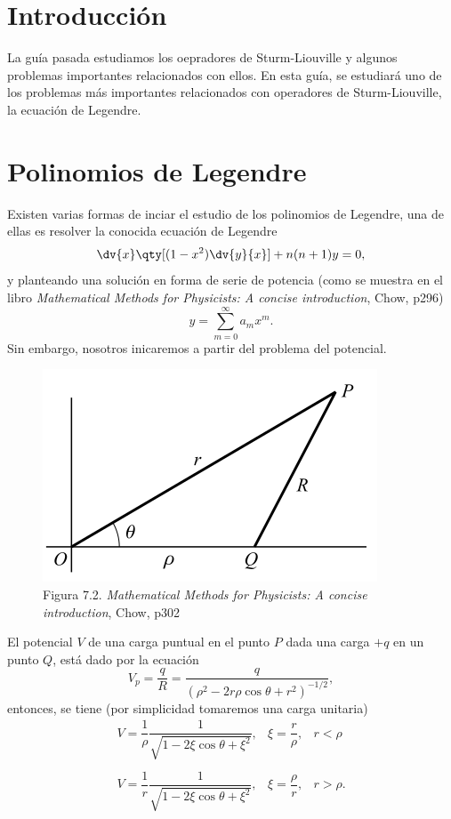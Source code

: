 \section*{Introducción}
La guía pasada estudiamos los oepradores de Sturm-Liouville y algunos problemas importantes relacionados con ellos. En esta guía, se estudiará uno de los problemas más importantes relacionados con operadores de Sturm-Liouville, la ecuación de Legendre.


\section*{Polinomios de Legendre}
Existen varias formas de inciar el estudio de los polinomios de Legendre, una de ellas es resolver la conocida ecuación de Legendre
	\begin{equation}
		\dv{x} \qty[(1 - x^2) \dv{y}{x}] + n(n + 1)y = 0, \label{eqlegendre}
	\end{equation}
y planteando una solución en forma de serie de potencia (como se muestra en el libro \textit{Mathematical Methods for Physicists: A concise introduction}, Chow, p296)
	$$ y = \sum _{m = 0} ^\infty a_m x^m. $$
Sin embargo, nosotros inicaremos a partir del problema del potencial.

\begin{figure}[H]
	\centering
	\includegraphics[scale=0.5]{./img/potential.png}
	\caption{Figura 7.2. \textit{Mathematical Methods for Physicists: A concise introduction}, Chow, p302}
	\label{potential}
\end{figure}

El potencial $V$ de una carga puntual en el punto $P$ dada una carga $+q$ en un punto $Q$, está dado por la ecuación
	$$ V_p = \frac{q}{R} = \frac{q}{(\rho ^2 - 2r\rho \cos{\theta} + r^2)^{-1/2}}, $$
entonces, se tiene (por simplicidad tomaremos una carga unitaria)
	$$
		\left.\begin{array}{ccc}
			V = \dfrac{1}{\rho} \dfrac{1}{\sqrt{1 - 2\xi \cos{\theta} + \xi ^2}}, & \xi = \dfrac{r}{\rho}, & r < \rho \\
			 & & \\
			V = \dfrac{1}{r} \dfrac{1}{\sqrt{1 - 2\xi\cos{\theta} + \xi ^2}}, & \xi = \dfrac{\rho}{r}, & r > \rho .
		\end{array}\right.
	$$



